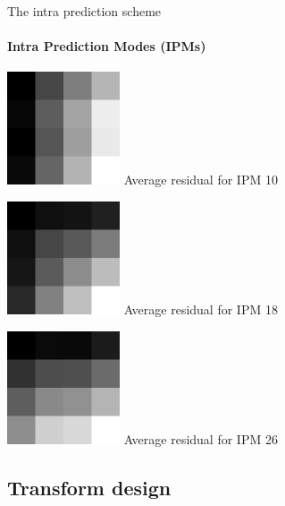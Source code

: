 \documentclass[10pt]{beamer} %
\begin{document}
\begin{frame}{The intra prediction scheme}
	\framesubtitle{Intra Prediction Modes (IPMs)}
	\begin{minipage}{0.48\textwidth}
		
	\end{minipage}
	\begin{minipage}{0.48\textwidth}
		\includegraphics[width=0.25\textwidth]{./figures/residuals_4_10.png}
		\hfill \small Average residual for IPM 10

		\vspace{1em}

		\includegraphics[width=0.25\textwidth]{./figures/residuals_4_18.png}
		\hfill \small Average residual for IPM 18

		\vspace{1em}

		\includegraphics[width=0.25\textwidth]{./figures/residuals_4_26.png}
		\hfill \small Average residual for IPM 26
	\end{minipage}
\end{frame}

\subsection{Transform design}
\end{document}
